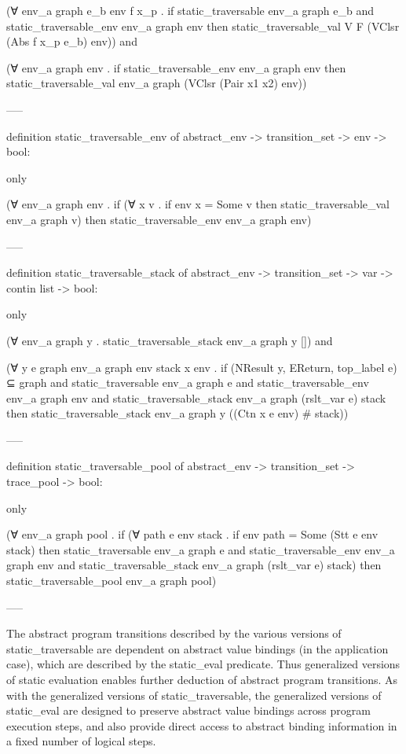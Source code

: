 (∀ env_a graph e_b env f x_p .
  if
    static_traversable env_a graph e_b and 
    static_traversable_env env_a graph env
  then
    static_traversable_val V F (VClsr (Abs f x_p e_b) env)) and

(∀ env_a graph env . 
  if
    static_traversable_env env_a graph env
  then
    static_traversable_val env_a graph (VClsr (Pair x1 x2) env))

-----

definition static_traversable_env of abstract_env -> transition_set -> env -> bool: 

only 

(∀ env_a graph env .
  if
    (∀ x v . if env x = Some v then static_traversable_val env_a graph v)
  then
    static_traversable_env env_a graph env) 


-----


definition static_traversable_stack of
  abstract_env -> transition_set -> var -> contin list -> bool:

only

(∀ env_a graph y . static_traversable_stack env_a graph y []) and

(∀ y e graph env_a graph env stack x env .
  if 
    {(NResult y, EReturn, top_label e)} ⊆ graph and
    static_traversable env_a graph e and
    static_traversable_env env_a graph env and
    static_traversable_stack env_a graph (rslt_var e) stack 
  then 
    static_traversable_stack env_a graph y ((Ctn x e env) # stack))


-----

definition static_traversable_pool of
  abstract_env -> transition_set -> trace_pool -> bool:

only

(∀ env_a graph pool .
  if
    (∀ path e env stack . if env path = Some (Stt e env stack) then 
      static_traversable env_a graph e and 
      static_traversable_env env_a graph env and 
      static_traversable_stack env_a graph (rslt_var e) stack) 
  then
      static_traversable_pool env_a graph pool)

-----

The abstract program transitions described by the various versions of static_traversable are
dependent on abstract value bindings (in the application case), which are described by the
static_eval predicate.  Thus generalized versions of static evaluation enables further
deduction of abstract program transitions.  As with the generalized versions of
static_traversable, the generalized versions of static_eval are designed to preserve abstract
value bindings across program execution steps, and also provide direct access to abstract
binding information in a fixed number of logical steps. 



